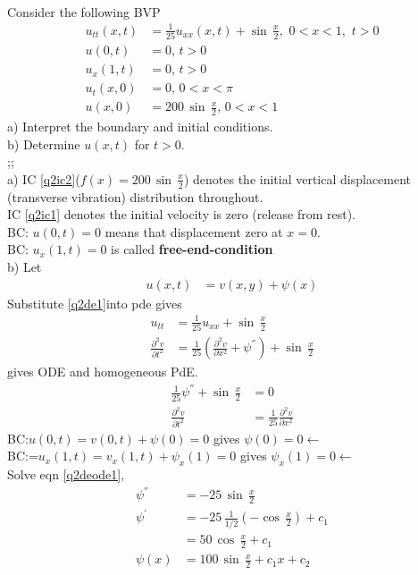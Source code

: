 \\
Consider the following BVP
\begin{align}
u_{tt}(x,t)&=\frac{1}{25}u_{xx}(x,t)+\sin\,\frac{x}{2},\,\,0<x<1,\,\,t>0\label{q2}\\
u(0,t)&=0,\,t>0\label{q2bc1}\\
u_x(1,t)&=0,\,t>0\label{q2bc2}\\
u_t(x,0)&=0,\,0<x<\pi\label{q2ic1}\\
u(x,0)&=200\,\sin\,\frac{x}{2},\,0<x<1\label{q2ic2}
\end{align}
a) Interpret the boundary and initial conditions.\\
b) Determine $u(x,t)$ for $t>0$.\\
;;\\
a) IC \eqref{q2ic2}($f(x)=200\,\sin\,\frac{x}{2}$) denotes the initial vertical displacement (transverse vibration) distribution throughout.\\
IC \eqref{q2ic1} denotes the initial velocity is zero (release from rest).\\
BC: $u(0,t)=0$  means that displacement zero at $x=0$.\\
BC: $u_x(1,t)=0$ is called {\bf free-end-condition}\\
b) Let 
\begin{align}
u(x,t)&=v(x,y)+\psi(x)\label{q2de1}
\end{align}
Substitute \eqref{q2de1}into pde gives
\begin{align*}
u_{tt}&=\frac{1}{25}u_{xx}+\sin\,\frac{x}{2}\\
\frac{\partial ^2v}{\partial t^2}&=\frac{1}{25}\left(\frac{\partial^2v}{\partial x^2}+\psi^{''}\right)+\sin\,\frac{x}{2}
\end{align*}
gives ODE and homogeneous PdE.
\begin{align}
\frac{1}{25}\psi^{''}+\sin\,\frac{x}{2}&=0\label{q2deode1}\\
\frac{\partial^2v}{\partial t^2}&=\frac{1}{25}\frac{\partial^2v}{\partial x^2}\label{pde2}
\end{align}
BC:$u(0,t)=v(0,t)+\psi(0)=0$ gives $\psi(0)=0\leftarrow$\\
BC:=$u_x(1,t)=v_x(1,t)+\psi_x(1)=0$ gives $\psi_x(1)=0\leftarrow$\\
Solve eqn \eqref{q2deode1},
\begin{align*}
\psi^{''}&=-25\,\sin\,\frac{x}{2}\\
\psi^{'}&=-25\,\frac{1}{1/2}(-\cos\,\frac{x}{2})+c_1\\
&=50\,\cos\,\frac{x}{2}+c_1\\
\psi(x)&=100\,\sin\,\frac{x}{2}+c_1x+c_2
\end{align*}
